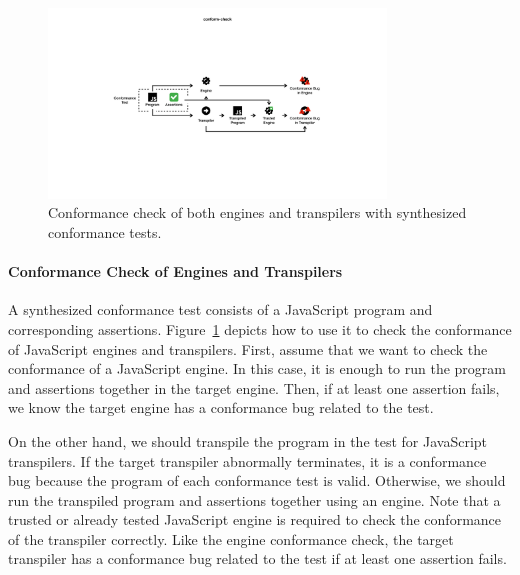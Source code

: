 \begin{figure}
  \includegraphics[width=0.8\textwidth]{img/conform-check}
  \caption{
    Conformance check of both engines and transpilers with synthesized
    conformance tests.
  }
  \label{fig:conform-check}
\end{figure}


\paragraph{\textbf{Conformance Check of Engines and Transpilers}}
%
A synthesized conformance test consists of a JavaScript program and
corresponding assertions.
%
Figure~\ref{fig:conform-check} depicts how to use it to check the conformance of
JavaScript engines and transpilers.
%
First, assume that we want to check the conformance of a JavaScript engine.
%
In this case, it is enough to run the program and assertions together in the
target engine.
%
Then, if at least one assertion fails, we know the target engine has a
conformance bug related to the test.

On the other hand, we should transpile the program in the test for JavaScript
transpilers.
%
If the target transpiler abnormally terminates, it is a conformance bug because
the program of each conformance test is valid.
%
Otherwise, we should run the transpiled program and assertions together using an
engine.
%
Note that a trusted or already tested JavaScript engine is required to check the
conformance of the transpiler correctly.
%
Like the engine conformance check, the target transpiler has a conformance bug
related to the test if at least one assertion fails.
